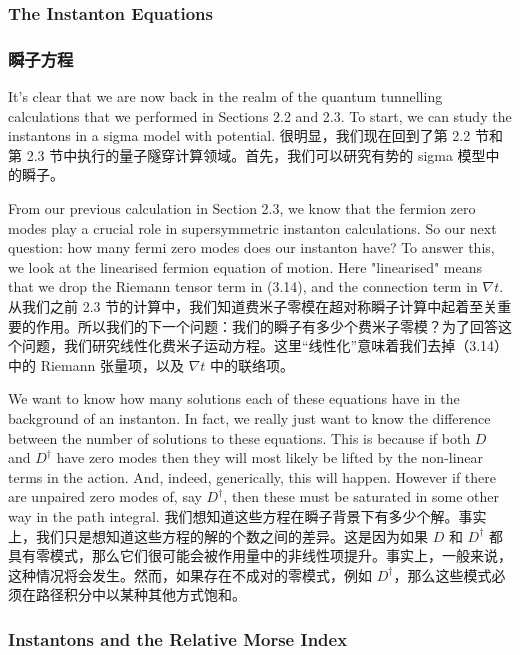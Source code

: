 \documentclass{ctexart}
\begin{document}
\begin{paracol}{2}
\subsubsection*{The Instanton Equations}
\switchcolumn
\subsubsection*{瞬子方程}
\switchcolumn*

It’s clear that we are now back in the realm of the quantum tunnelling calculations that we performed in Sections 2.2 and 2.3. To start, we can study the instantons in a sigma model with potential.
\switchcolumn
很明显，我们现在回到了第 2.2 节和第 2.3 节中执行的量子隧穿计算领域。首先，我们可以研究有势的 sigma 模型中的瞬子。
\switchcolumn*

From our previous calculation in Section 2.3, we know that the fermion zero modes play a crucial role in supersymmetric instanton calculations. So our next question: how many fermi zero modes does our instanton have? To answer this, we look at the linearised fermion equation of motion. Here "linearised" means that we drop the Riemann tensor term in (3.14), and the connection term in $\nabla t$.
\switchcolumn
从我们之前 2.3 节的计算中，我们知道费米子零模在超对称瞬子计算中起着至关重要的作用。所以我们的下一个问题：我们的瞬子有多少个费米子零模？为了回答这个问题，我们研究线性化费米子运动方程。这里“线性化”意味着我们去掉（3.14）中的 Riemann 张量项，以及 $\nabla t$ 中的联络项。
\switchcolumn*

We want to know how many solutions each of these equations have in the background of an instanton. In fact, we really just want to know the difference between the number of solutions to these equations. This is because if both $D$ and $D^{\dagger}$ have zero modes then they will most likely be lifted by the non-linear terms in the action. And, indeed, generically, this will happen. However if there are unpaired zero modes of, say $D^{\dagger}$, then these must be saturated in some other way in the path integral.
\switchcolumn
我们想知道这些方程在瞬子背景下有多少个解。事实上，我们只是想知道这些方程的解的个数之间的差异。这是因为如果 $D$ 和 $D^{\dagger}$ 都具有零模式，那么它们很可能会被作用量中的非线性项提升。事实上，一般来说，这种情况将会发生。然而，如果存在不成对的零模式，例如 $D^{\dagger}$，那么这些模式必须在路径积分中以某种其他方式饱和。
\switchcolumn*

\subsubsection*{Instantons and the Relative Morse Index}
\switchcolumn

\end{paracol}
\end{document}
